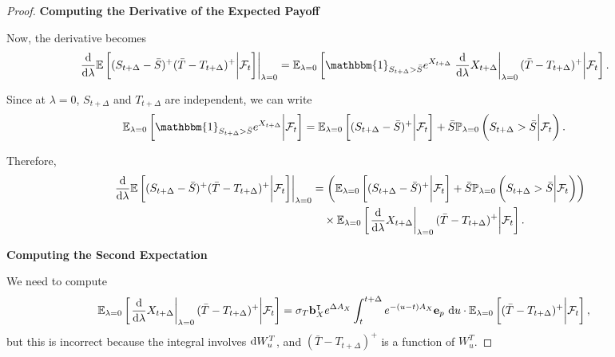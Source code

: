 \documentclass[10pt,a4paper,reqno]{amsart}
\theoremstyle{example}
\newcommand*\D{\mathop{}\!\textnormal{d}}
\begin{document}
\begin{proof}
\textbf{Computing the Derivative of the Expected Payoff}

Now, the derivative becomes
\begin{align}
\left. \frac{\D}{\D \lambda} \mathbb{E}\left[ (S_{t+\Delta} - \bar{S})^+ (\bar{T} - T_{t+\Delta})^+ \bigg| \mathcal{F}_t \right] \right|_{\lambda = 0} &= \mathbb{E}_{\lambda = 0} \left[ \mathbbm{1}_{S_{t+\Delta} > \bar{S}} e^{X_{t+\Delta}} \left. \frac{\D}{\D \lambda} X_{t+\Delta} \right|_{\lambda = 0} (\bar{T} - T_{t+\Delta})^+ \bigg| \mathcal{F}_t \right].
\end{align}

Since at $\lambda = 0$, $S_{t+\Delta}$ and $T_{t+\Delta}$ are independent, we can write
\begin{align}
&\mathbb{E}_{\lambda = 0} \left[ \mathbbm{1}_{S_{t+\Delta} > \bar{S}} e^{X_{t+\Delta}} \bigg| \mathcal{F}_t \right] = \mathbb{E}_{\lambda = 0} \left[ (S_{t+\Delta} - \bar{S})^+ \bigg| \mathcal{F}_t \right] + \bar{S} \mathbb{P}_{\lambda = 0} \left( S_{t+\Delta} > \bar{S} \bigg| \mathcal{F}_t \right).
\end{align}

Therefore,
\begin{align}
\left. \frac{\D}{\D \lambda} \mathbb{E}\left[ (S_{t+\Delta} - \bar{S})^+ (\bar{T} - T_{t+\Delta})^+ \bigg| \mathcal{F}_t \right] \right|_{\lambda = 0} &= \left( \mathbb{E}_{\lambda = 0} \left[ (S_{t+\Delta} - \bar{S})^+ \bigg| \mathcal{F}_t \right] + \bar{S} \mathbb{P}_{\lambda = 0} \left( S_{t+\Delta} > \bar{S} \bigg| \mathcal{F}_t \right) \right) \nonumber \\
&\quad \times \mathbb{E}_{\lambda = 0} \left[ \left. \frac{\D}{\D \lambda} X_{t+\Delta} \right|_{\lambda = 0} (\bar{T} - T_{t+\Delta})^+ \bigg| \mathcal{F}_t \right].
\end{align}

\textbf{Computing the Second Expectation}

We need to compute
\begin{align}
\mathbb{E}_{\lambda = 0} \left[ \left. \frac{\D}{\D \lambda} X_{t+\Delta} \right|_{\lambda = 0} (\bar{T} - T_{t+\Delta})^+ \bigg| \mathcal{F}_t \right] &= \sigma_T \mathbf{b}_X^\intercal e^{\Delta A_X} \int_t^{t+\Delta} e^{-(u - t) A_X} \mathbf{e}_p \, \D u \cdot \mathbb{E}_{\lambda = 0} \left[ (\bar{T} - T_{t+\Delta})^+ \bigg| \mathcal{F}_t \right],
\end{align}
but this is incorrect because the integral involves $\D W_u^T$, and $(\bar{T} - T_{t+\Delta})^+$ is a function of $W_u^T$.


\end{proof}
\end{document}
